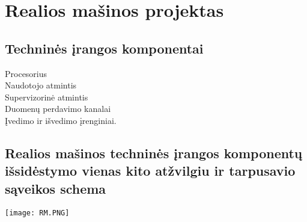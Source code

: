 \section{Realios mašinos projektas}

\subsection{Techninės įrangos komponentai}

\begin{description}
  \item[Procesorius] 
  \item[Naudotojo atmintis]
  \item[Supervizorinė atmintis]
  \item[Duomenų perdavimo kanalai] 
  \item[Įvedimo ir išvedimo įrenginiai.] 
\end{description}

\subsection{Realios mašinos techninės įrangos komponentų išsidėstymo vienas kito atžvilgiu ir tarpusavio sąveikos schema}
\texttt{[image: RM.PNG]}
